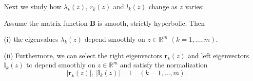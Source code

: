 Next we study how $\lambda_k(z)$, $r_k(z)$ and $l_k(z)$ change as $z$ varies:

\begin{theorem}
\label{thm:smooth-dependence-eigenvalues-eigenvectors}
Assume the matrix function $\mathbf{B}$ is smooth, strictly hyperbolic. Then

(i) the eigenvalues $\lambda_k(z)$ depend smoothly on $z\in\mathbb{R}^m$ $(k=1,\ldots,m)$.

(ii) Furthermore, we can select the right eigenvectors $\mathbf{r}_k(z)$ and left eigenvectors $\mathbf{l}_k(z)$ to depend smoothly on $z\in\mathbb{R}^m$ and satisfy the normalization
$$|\mathbf{r}_k(z)|,\ |\mathbf{l}_k(z)| = 1 \quad (k=1,\ldots,m).$$
\end{theorem}

